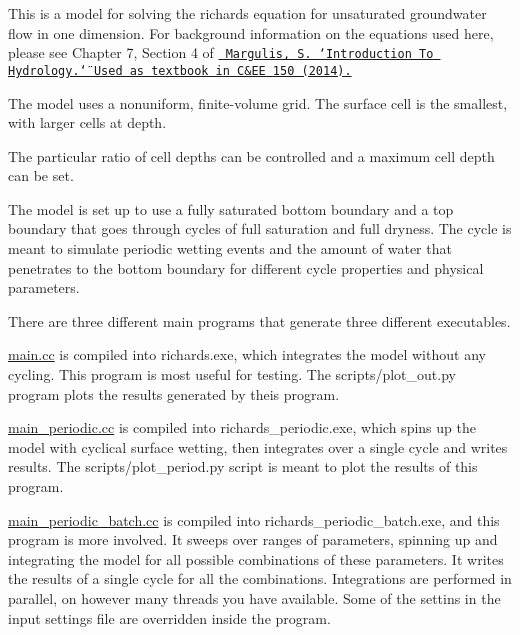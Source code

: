 This is a model for solving the richards equation for unsaturated groundwater flow in one dimension. For background information on the equations used here, please see Chapter 7, Section 4 of \href{https://margulis-group.github.io/teaching/}{\texttt{ Margulis, S. \char`\"{}\+Introduction To Hydrology.\char`\"{} Used as textbook in C\&EE 150 (2014).}}
\begin{DoxyItemize}
\item The model uses a nonuniform, finite-\/volume grid. The surface cell is the smallest, with larger cells at depth.
\item The particular ratio of cell depths can be controlled and a maximum cell depth can be set.
\item The model is set up to use a fully saturated bottom boundary and a top boundary that goes through cycles of full saturation and full dryness. The cycle is meant to simulate periodic wetting events and the amount of water that penetrates to the bottom boundary for different cycle properties and physical parameters.
\item There are three different {\ttfamily main} programs that generate three different executables.
\begin{DoxyEnumerate}
\item {\ttfamily \mbox{\hyperlink{main_8cc}{main.\+cc}}} is compiled into {\ttfamily richards.\+exe}, which integrates the model without any cycling. This program is most useful for testing. The {\ttfamily scripts/plot\+\_\+out.\+py} program plots the results generated by theis program.
\item {\ttfamily \mbox{\hyperlink{main__periodic_8cc}{main\+\_\+periodic.\+cc}}} is compiled into {\ttfamily richards\+\_\+periodic.\+exe}, which spins up the model with cyclical surface wetting, then integrates over a single cycle and writes results. The {\ttfamily scripts/plot\+\_\+period.\+py} script is meant to plot the results of this program.
\item {\ttfamily \mbox{\hyperlink{main__periodic__batch_8cc}{main\+\_\+periodic\+\_\+batch.\+cc}}} is compiled into {\ttfamily richards\+\_\+periodic\+\_\+batch.\+exe}, and this program is more involved. It sweeps over ranges of parameters, spinning up and integrating the model for all possible combinations of these parameters. It writes the results of a single cycle for all the combinations. Integrations are performed in parallel, on however many threads you have available. Some of the settins in the input settings file are overridden inside the program.
\end{DoxyEnumerate}
\end{DoxyItemize}

